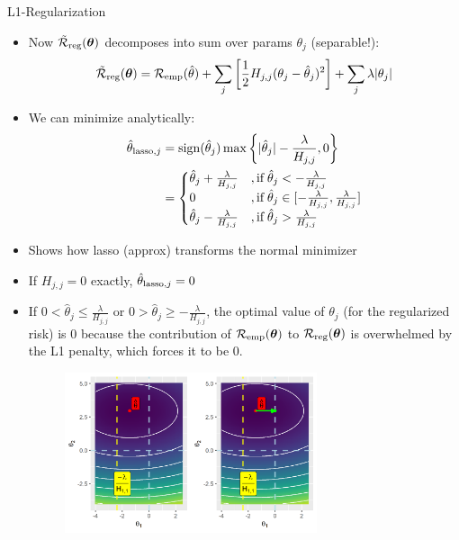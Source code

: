 \documentclass[11pt,compress,t,notes=noshow, xcolor=table]{beamer}
\begin{document}
\begin{vbframe} {L1-Regularization}
\begin{itemize}
    \item Now $\mathcal{\tilde R}_{\text{reg}}(\bm{\theta})$ decomposes into sum over params $\theta_j$ (separable!):
  $$\mathcal{\tilde R}_{\text{reg}}(\bm{\theta}) = \mathcal{R}_{\text{emp}}(\hat{\theta}) + \sum_j \left[ \frac{1}{2} H_{j,j} (\theta_j - \hat{\theta}_j)^2 \right] + \sum_j \lambda |\theta_j|$$
    \item We can minimize analytically:
     \begin{align*}\hat{\theta}_{\text{lasso},j} &= \operatorname{sign}(\hat{\theta}_j) \max \left\{ |\hat{\theta}_j| - \frac{\lambda}{H_{j,j}},0 \right\} \\
     &= \begin{cases} 
     \hat{\theta}_j + \frac{\lambda}{H_{j,j}} &, \text{if}   \;\hat{\theta}_j < -\frac{\lambda}{H_{j,j}} \\
       0 &, \text{if}   \;\hat{\theta}_j \in [-\frac{\lambda}{H_{j,j}}, \frac{\lambda}{H_{j,j}}] \\
     \hat{\theta}_j - \frac{\lambda}{H_{j,j}} &, \text{if}   \;\hat{\theta}_j > \frac{\lambda}{H_{j,j}} \\
     \end{cases}
     \end{align*}
  \item Shows how lasso (approx) transforms the normal minimizer
  \item If $H_{j,j} = 0$ exactly, $\hat{\theta}_{\text{lasso},j} = 0$

\framebreak

\item If  $0 < \hat{\theta}_j \leq \frac{\lambda}{H_{j,j}}$ or $0 > \hat{\theta}_j \geq -\frac{\lambda}{H_{j,j}}$, the optimal value of $\theta_j$ (for the regularized risk) is $0$ because the contribution of  $\mathcal{R}_{\text{emp}}(\bm{\theta})$ to $\mathcal{R}_{\text{reg}}(\bm{\theta})$ is overwhelmed by the L1 penalty, which forces it to be $0$.

\begin{figure}
\includegraphics[width=0.7\textwidth]{figure/l1_reg_hess_01.png}\\
\end{figure}


\end{itemize}
\end{vbframe}
\end{document}
